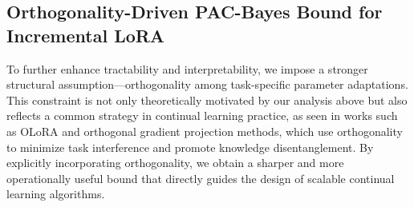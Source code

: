 \documentclass[letterpaper]{article} %
\begin{document}
\subsection{Orthogonality-Driven PAC-Bayes Bound for Incremental LoRA}






To further enhance tractability and interpretability, we impose a stronger structural assumption—orthogonality among task-specific parameter adaptations. This constraint is not only theoretically motivated by our analysis above but also reflects a common strategy in continual learning practice, as seen in works such as OLoRA and orthogonal gradient projection methods, which use orthogonality to minimize task interference and promote knowledge disentanglement. By explicitly incorporating orthogonality, we obtain a sharper and more operationally useful bound that directly guides the design of scalable continual learning algorithms.
\end{document}
